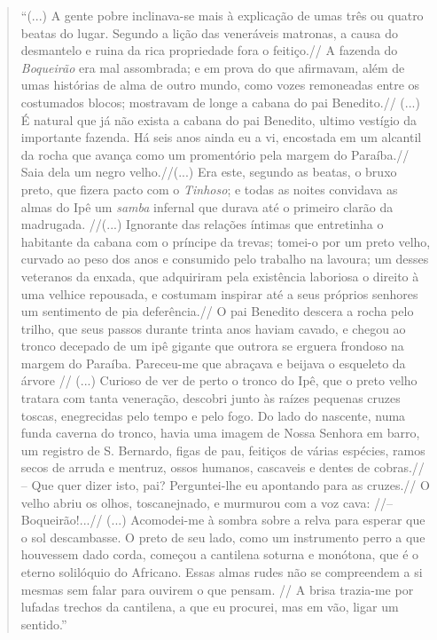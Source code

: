 \begin{quote}
``(...) A gente pobre inclinava-se mais à explicação de umas três ou
quatro beatas do lugar. Segundo a lição das veneráveis matronas, a causa
do desmantelo e ruina da rica propriedade fora o feitiço.// A fazenda do
\emph{Boqueirão} era mal assombrada; e em prova do que afirmavam, além
de umas histórias de alma de outro mundo, como vozes remoneadas entre os
costumados blocos; mostravam de longe a cabana do pai Benedito.// (...)
É natural que já não exista a cabana do pai Benedito, ultimo vestígio da
importante fazenda. Há seis anos ainda eu a vi, encostada em um alcantil
da rocha que avança como um promentório pela margem do Paraíba.// Saia
dela um negro velho.//(...) Era este, segundo as beatas, o bruxo preto,
que fizera pacto com o \emph{Tinhoso}; e todas as noites convidava as
almas do Ipê um \emph{samba} infernal que durava até o primeiro clarão
da madrugada. //(...) Ignorante das relações íntimas que entretinha o
habitante da cabana com o príncipe da trevas; tomei-o por um preto
velho, curvado ao peso dos anos e consumido pelo trabalho na lavoura; um
desses veteranos da enxada, que adquiriram pela existência laboriosa o
direito à uma velhice repousada, e costumam inspirar até a seus próprios
senhores um sentimento de pia deferência.// O pai Benedito descera a
rocha pelo trilho, que seus passos durante trinta anos haviam cavado, e
chegou ao tronco decepado de um ipê gigante que outrora se erguera
frondoso na margem do Paraíba. Pareceu-me que abraçava e beijava o
esqueleto da árvore // (...) Curioso de ver de perto o tronco do Ipê,
que o preto velho tratara com tanta veneração, descobri junto às raízes
pequenas cruzes toscas, enegrecidas pelo tempo e pelo fogo. Do lado do
nascente, numa funda caverna do tronco, havia uma imagem de Nossa
Senhora em barro, um registro de S. Bernardo, figas de pau, feitiços de
várias espécies, ramos secos de arruda e mentruz, ossos humanos,
cascaveis e dentes de cobras.// -- Que quer dizer isto, pai?
Perguntei-lhe eu apontando para as cruzes.// O velho abriu os olhos,
toscanejnado, e murmurou com a voz cava: //-- Boqueirão!...// (...)
Acomodei-me à sombra sobre a relva para esperar que o sol descambasse. O
preto de seu lado, como um instrumento perro a que houvessem dado corda,
começou a cantilena soturna e monótona, que é o eterno solilóquio do
Africano. Essas almas rudes não se compreendem a si mesmas sem falar
para ouvirem o que pensam. // A brisa trazia-me por lufadas trechos da
cantilena, a que eu procurei, mas em vão, ligar um sentido.''


\end{quote}
